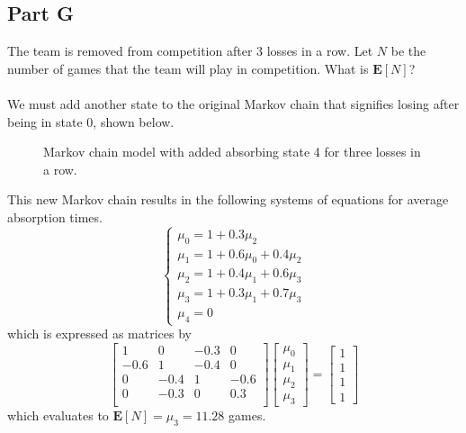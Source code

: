 \documentclass{amsart}
\begin{document}
	\subsection{Part G}
	The team is removed from competition after 3 losses in a row. Let $N$ be the number of games that the team will play in competition. What is $\mathbf{E}[N]$?\\
	\\
	We must add another state to the original Markov chain that signifies losing after being in state 0, shown below.
	\begin{figure}[h!]
		\centering
	\caption{Markov chain model with added absorbing state 4 for three losses in a row.}
	\end{figure}
	
	This new Markov chain results in the following systems of equations for average absorption times.
	\[
	\begin{cases}
	\mu_0 = 1 + 0.3\mu_2\\
	\mu_1 = 1 + 0.6\mu_0 + 0.4\mu_2\\
	\mu_2 = 1 + 0.4\mu_1 + 0.6\mu_3\\
	\mu_3 = 1 + 0.3\mu_1 + 0.7\mu_3\\
	\mu_4 = 0
	\end{cases}
	\]
	which is expressed as matrices by
	\[
	\begin{bmatrix}
	1    & 0    & -0.3 & 0\\
	-0.6 & 1    & -0.4 & 0\\
	0    & -0.4 & 1    & -0.6\\
	0    & -0.3 & 0    & 0.3\\
	\end{bmatrix}
	\begin{bmatrix}
	\mu_0\\\mu_1\\\mu_2\\\mu_3
	\end{bmatrix}
	=
	\begin{bmatrix}
	1\\1\\1\\1
	\end{bmatrix}
	\]
	which evaluates to $\mathbf{E}[N] = \mu_3 = 11.28$ games.
\end{document}
